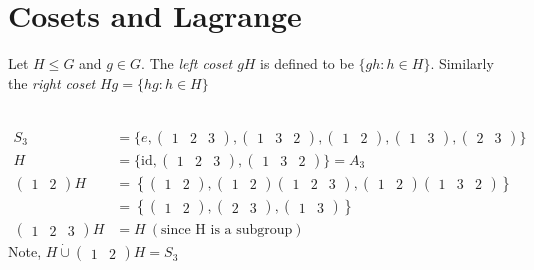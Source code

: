 \hypertarget{cosets-and-lagrange}{%
\section{Cosets and Lagrange}\label{cosets-and-lagrange}}

\begin{definition}[Cosets]
Let \(H \leq G\) and \(g \in G\).
The \emph{left coset \(gH\)} is defined to be \(\{ gh : h \in H \}\).
Similarly the \emph{right coset} \(Hg = \{ hg : h \in H \}\)
\end{definition}

\begin{example} ~\vspace*{-1.5\baselineskip}
\begin{align*}
    S_3 &= \{ e, \begin{pmatrix}1 & 2 & 3\end{pmatrix}, \begin{pmatrix}1 & 3 & 2\end{pmatrix}, \begin{pmatrix}1 & 2\end{pmatrix}, \begin{pmatrix}1 & 3\end{pmatrix}, \begin{pmatrix}2 & 3\end{pmatrix} \} \\
    H &= \{ \text{id}, \begin{pmatrix}1 & 2 & 3\end{pmatrix}, \begin{pmatrix}1 & 3 & 2\end{pmatrix} \} = A_3 \\
    \begin{pmatrix}1 & 2\end{pmatrix}H &= \left\{ \begin{pmatrix}1 & 2\end{pmatrix}, \begin{pmatrix}1 & 2\end{pmatrix}\begin{pmatrix}1 & 2 & 3\end{pmatrix}, \begin{pmatrix}1 & 2\end{pmatrix}\begin{pmatrix}1 & 3 & 2\end{pmatrix} \right\} \\
    &= \left\{ \begin{pmatrix}1 & 2\end{pmatrix}, \begin{pmatrix}2 & 3\end{pmatrix}, \begin{pmatrix}1 & 3\end{pmatrix} \right\} \\
    \begin{pmatrix}1 & 2 & 3\end{pmatrix}H &= H \ (\text{since H is a subgroup})
\end{align*}
Note, \(H \mathbin{\dot{\cup}} \begin{pmatrix}1 & 2\end{pmatrix}H = S_3\)
\end{example}

